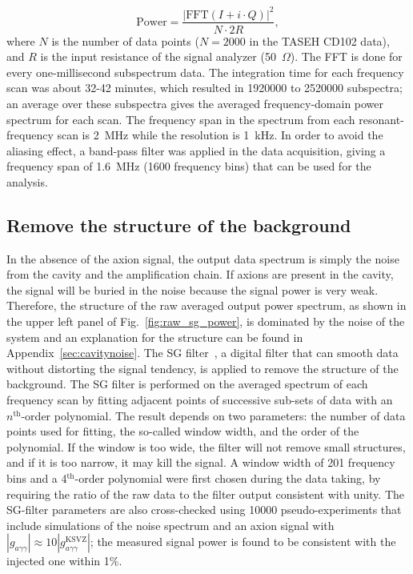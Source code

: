 \documentclass[%
reprint, %
superscriptaddress,
 amsmath,amssymb,
 aps
]{revtex4-2}
\begin{document}
\begin{equation}
\label{eq:4.1}
    \text{Power} = \frac{|\text{FFT}(I+i \cdot Q)|^{2}}{N \cdot 2R},
\end{equation}
where $N$ is the number of data points ($N  = 2000$ in the TASEH 
CD102 data), and $R$ is the input resistance of the signal analyzer 
(50~$\Omega$).
The FFT is done for every one-millisecond subspectrum data. The integration 
time for each frequency scan was about 32-42 minutes, which resulted 
in 1920000 to 2520000 subspectra; an average over these subspectra gives 
the averaged frequency-domain power spectrum for each scan. 
The frequency span in the spectrum from each resonant-frequency scan is 
2~MHz while the resolution is 1~kHz. In order to avoid the aliasing 
effect, a band-pass filter was applied in the data acquisition, 
giving a frequency span of 1.6~MHz (1600 frequency bins) that can be used 
for the analysis. 


\subsection{Remove the structure of the background} 
In the absence of the axion signal, the output data spectrum is simply the 
noise from the cavity and the amplification chain. If axions are present 
in the cavity, the signal will be buried in the noise because the 
signal power is very weak. Therefore, the structure of the raw averaged 
output power spectrum, as shown in the upper left panel of 
Fig.~\ref{fig:raw_sg_power}, is dominated 
by the noise of the system and an explanation for the structure can be found 
in Appendix~\ref{sec:cavitynoise}. The SG 
filter~\cite{SGFilter}, a digital filter that can smooth data without 
distorting the signal tendency, is applied to remove the structure of the  
background. The SG filter is performed on the averaged spectrum of each 
frequency scan by fitting adjacent points of successive sub-sets of data with 
an $n^\text{th}$-order polynomial. The result depends on two parameters: 
the number of 
data points used for fitting, the so-called window width, and the order of 
the polynomial. If the window is too wide, the filter will not remove small 
structures, and if it is too narrow, it may kill the signal. 
A window width of 201 frequency bins and a 4$^\text{th}$-order polynomial 
were first chosen during the data taking, by 
requiring the ratio of the raw data to the filter 
output consistent with unity.  
The SG-filter parameters 
are also cross-checked using 10000 pseudo-experiments that include simulations 
of the noise spectrum and an axion signal with 
$\left|g_{a\gamma\gamma}\right|\approx 10 \left|g_{a\gamma\gamma}^\text{KSVZ}\right|$; the measured signal power 
is found to be consistent with the injected one within 1\%.
\end{document}
